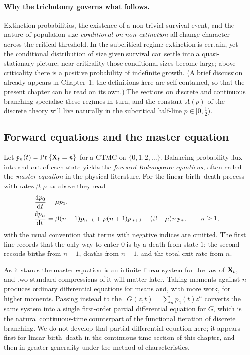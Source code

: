 \paragraph{Why the trichotomy governs what follows.}
Extinction probabilities, the existence of a non-trivial survival event, and the nature of population size \emph{conditional on non-extinction} all change character across the critical threshold. In the subcritical regime extinction is certain, yet the conditional distribution of size given survival can settle into a quasi-stationary picture; near criticality those conditional sizes become large; above criticality there is a positive probability of indefinite growth. (A brief discussion already appears in Chapter~1; the definitions here are self-contained, so that the present chapter can be read on its own.) The sections on discrete and continuous branching specialise these regimes in turn, and the constant $A(p)$ of the discrete theory will live naturally in the subcritical half-line $p\in[0,\tfrac12)$.

\subsection{Forward equations and the master equation}
\label{sec:master-eq}

Let $p_n(t)={\text{Pr}\left\{{{\bf X}_t}=n\right\}}$ for a CTMC on $\{0,1,2,\ldots\}$. Balancing probability flux into and out of each state yields the \emph{forward Kolmogorov equations}, often called the \emph{master equation} in the physical literature. For the linear birth--death process with rates $\beta,\mu$ as above they read
\begin{align*}
\displaystyle\frac{{\rm d} p_0}{{\rm d} t}
&=
\mu p_1,
\\
\displaystyle\frac{{\rm d} p_n}{{\rm d} t}
&=
\beta(n-1)p_{n-1}
+
\mu(n+1)p_{n+1}
-
(\beta+\mu)n\, p_n,
\qquad
n\geq 1,
\end{align*}
with the usual convention that terms with negative indices are omitted. The first line records that the only way to enter $0$ is by a death from state $1$; the second records births from $n-1$, deaths from $n+1$, and the total exit rate from $n$.

As it stands the master equation is an infinite linear system for the law of ${{\bf X}_t}$, and two standard compressions of it will matter later. Taking moments against $n$ produces ordinary differential equations for means and, with more work, for higher moments. Passing instead to the \pgf\ $G(z,t)=\sum_n p_n(t) z^n$ converts the same system into a single first-order partial differential equation for $G$, which is the natural continuous-time counterpart of the functional iteration of discrete branching. We do not develop that partial differential equation here; it appears first for linear birth--death in the continuous-time section of this chapter, and then in greater generality under the method of characteristics.
